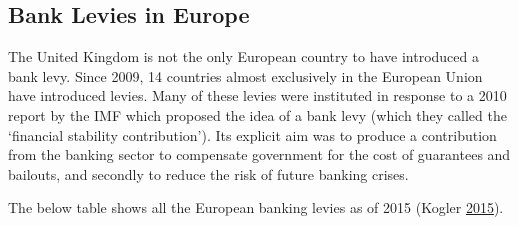 \documentclass[]{tufte-handout}
\begin{document}
\hypertarget{bank-levies-in-europe}{%
\subsection{Bank Levies in Europe}\label{bank-levies-in-europe}}

The United Kingdom is not the only European country to have introduced a
bank levy. Since 2009, 14 countries almost exclusively in the European
Union have introduced levies. Many of these levies were instituted in
response to a 2010 report by the IMF which proposed the idea of a bank
levy (which they called the `financial stability contribution'). Its
explicit aim was to produce a contribution from the banking sector to
compensate government for the cost of guarantees and bailouts, and
secondly to reduce the risk of future banking crises.

The below table shows all the European banking levies as of 2015 (Kogler
\protect\hyperlink{ref-Kogler2015}{2015}).
\end{document}
